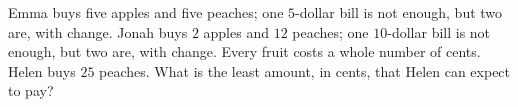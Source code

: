 Emma buys five apples and five peaches; one $5$-dollar bill is not enough, but two are, with change. Jonah buys $2$ apples and $12$ peaches; one $10$-dollar bill is not enough, but two are, with change. Every fruit costs a whole number of cents. Helen buys $25$ peaches. What is the least amount, in cents, that Helen can expect to pay?
